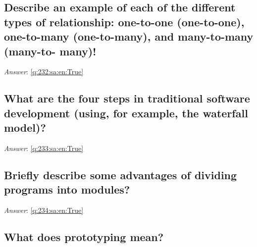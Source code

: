 \documentclass[a4paper,11pt,oneside]{article}
\begin{document}
\begin{sloppypar}
\subsection{Describe an example of each of the different types of relationship: one-to-one (one-to-one), one-to-many (one-to-many), and many-to-many (many-to- many)!}

\label{q:232:sa:en:False}

\vspace{2cm}

\noindent\makebox[\textwidth]{\hrulefill}

\vspace{1cm}

\textit{Answer}: \autoref{q:232:sa:en:True}



\subsection{What are the four steps in traditional software development (using, for example, the waterfall model)?}

\label{q:233:sa:en:False}

\vspace{2cm}

\noindent\makebox[\textwidth]{\hrulefill}

\vspace{1cm}

\textit{Answer}: \autoref{q:233:sa:en:True}



\subsection{Briefly describe some advantages of dividing programs into modules?}

\label{q:234:sa:en:False}

\vspace{2cm}

\noindent\makebox[\textwidth]{\hrulefill}

\vspace{1cm}

\textit{Answer}: \autoref{q:234:sa:en:True}



\subsection{What does prototyping mean?}


\end{sloppypar}
\end{document}
